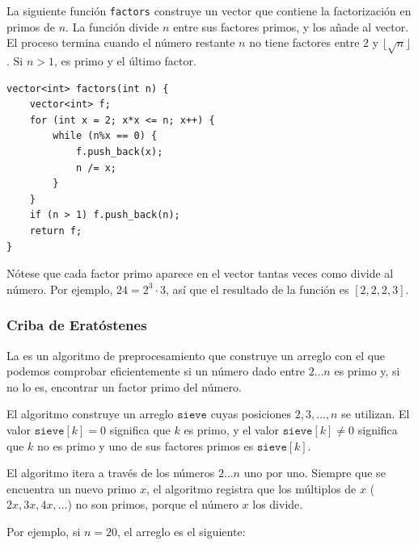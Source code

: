 \noindent
La siguiente función \texttt{factors}
construye un vector que contiene la factorización
en primos de $n$.
La función divide $n$ entre sus factores primos,
y los añade al vector.
El proceso termina cuando el número restante $n$
no tiene factores entre $2$ y $\lfloor \sqrt n \rfloor$.
Si $n>1$, es primo y el último factor.

\begin{lstlisting}
vector<int> factors(int n) {
    vector<int> f;
    for (int x = 2; x*x <= n; x++) {
        while (n%x == 0) {
            f.push_back(x);
            n /= x;
        }
    }
    if (n > 1) f.push_back(n);
    return f;
}
\end{lstlisting}

Nótese que cada factor primo aparece en el vector
tantas veces como divide al número.
Por ejemplo, $24=2^3 \cdot 3$,
así que el resultado de la función es $[2,2,2,3]$.

\subsubsection{Criba de Eratóstenes}


La 
es un algoritmo
de preprocesamiento que construye un arreglo con el que
podemos comprobar eficientemente si un número dado entre $2 \ldots n$
es primo y, si no lo es, encontrar un factor primo del número.

El algoritmo construye un arreglo $\texttt{sieve}$
cuyas posiciones $2,3,\ldots,n$ se utilizan.
El valor $\texttt{sieve}[k]=0$ significa
que $k$ es primo,
y el valor $\texttt{sieve}[k] \neq 0$
significa que $k$ no es primo y uno
de sus factores primos es $\texttt{sieve}[k]$.

El algoritmo itera a través de los números
$2 \ldots n$ uno por uno.
Siempre que se encuentra un nuevo primo $x$,
el algoritmo registra que los múltiplos
de $x$ ($2x,3x,4x,\ldots$) no son primos,
porque el número $x$ los divide.

Por ejemplo, si $n=20$, el arreglo es el siguiente:

